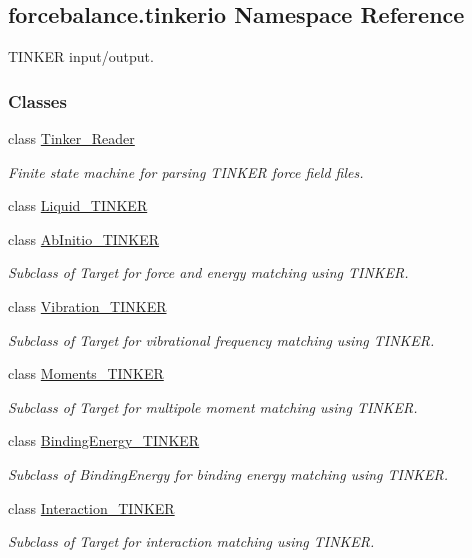 \hypertarget{namespaceforcebalance_1_1tinkerio}{\subsection{forcebalance.\-tinkerio Namespace Reference}
\label{namespaceforcebalance_1_1tinkerio}
}


T\-I\-N\-K\-E\-R input/output.  


\subsubsection*{Classes}
\begin{DoxyCompactItemize}
\item 
class \hyperlink{classforcebalance_1_1tinkerio_1_1Tinker__Reader}{Tinker\-\_\-\-Reader}
\begin{DoxyCompactList}\small\item\em Finite state machine for parsing T\-I\-N\-K\-E\-R force field files. \end{DoxyCompactList}\item 
class \hyperlink{classforcebalance_1_1tinkerio_1_1Liquid__TINKER}{Liquid\-\_\-\-T\-I\-N\-K\-E\-R}
\item 
class \hyperlink{classforcebalance_1_1tinkerio_1_1AbInitio__TINKER}{Ab\-Initio\-\_\-\-T\-I\-N\-K\-E\-R}
\begin{DoxyCompactList}\small\item\em Subclass of Target for force and energy matching using T\-I\-N\-K\-E\-R. \end{DoxyCompactList}\item 
class \hyperlink{classforcebalance_1_1tinkerio_1_1Vibration__TINKER}{Vibration\-\_\-\-T\-I\-N\-K\-E\-R}
\begin{DoxyCompactList}\small\item\em Subclass of Target for vibrational frequency matching using T\-I\-N\-K\-E\-R. \end{DoxyCompactList}\item 
class \hyperlink{classforcebalance_1_1tinkerio_1_1Moments__TINKER}{Moments\-\_\-\-T\-I\-N\-K\-E\-R}
\begin{DoxyCompactList}\small\item\em Subclass of Target for multipole moment matching using T\-I\-N\-K\-E\-R. \end{DoxyCompactList}\item 
class \hyperlink{classforcebalance_1_1tinkerio_1_1BindingEnergy__TINKER}{Binding\-Energy\-\_\-\-T\-I\-N\-K\-E\-R}
\begin{DoxyCompactList}\small\item\em Subclass of Binding\-Energy for binding energy matching using T\-I\-N\-K\-E\-R. \end{DoxyCompactList}\item 
class \hyperlink{classforcebalance_1_1tinkerio_1_1Interaction__TINKER}{Interaction\-\_\-\-T\-I\-N\-K\-E\-R}
\begin{DoxyCompactList}\small\item\em Subclass of Target for interaction matching using T\-I\-N\-K\-E\-R. \end{DoxyCompactList}\end{DoxyCompactItemize}
